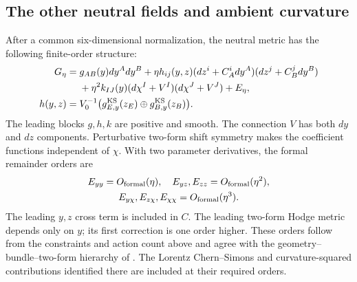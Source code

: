 \subsection{The other neutral fields and ambient curvature}
After a common six-dimensional normalization, the neutral metric
has the following finite-order structure:
\begin{align}\label{eq:blockmetric}
 G_\eta={}&g_{AB}(y)dy^A dy^B
 +\eta h_{ij}(y,z)(dz^i+C_A^i dy^A)(dz^j+C_B^jdy^B)\nonumber\\
 &+\eta^2 k_{IJ}(y)(d\chi^I+V^I)(d\chi^J+V^J)+E_\eta,
 \\
 h(y,z)={}&V_0^{-1}\bigl(g^{\rm KS}_{E,y}(z_E)
                               \oplus g^{\rm KS}_{B,y}(z_B)\bigr).
 \label{eq:productbundle}
\end{align}
The leading blocks $g,h,k$ are positive and smooth. The connection
$V$ has both $dy$ and $dz$ components. Perturbative two-form shift
symmetry makes the coefficient functions independent of $\chi$.
With two parameter derivatives, the formal remainder orders are
\begin{equation}\label{eq:blockorders}
 \begin{gathered}
 E_{yy}=O_{\mathrm{formal}}(\eta),\quad
 E_{yz},E_{zz}=O_{\mathrm{formal}}(\eta^2),\\
 E_{y\chi},E_{z\chi},E_{\chi\chi}=O_{\mathrm{formal}}(\eta^3).
 \end{gathered}
\end{equation}
The leading $y,z$ cross term is included in $C$.
The leading two-form Hodge metric depends only on $y$; its
first correction is one order higher. These orders follow from
the constraints and action count above and agree with the
geometry--bundle--two-form hierarchy of \cite{alpv}. The Lorentz
Chern--Simons and curvature-squared contributions identified there
are included at their required orders.

